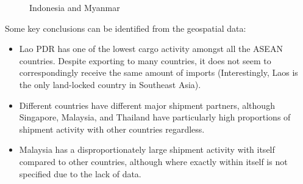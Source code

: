 \documentclass{article}
\begin{document}
\begin{figure}[H]
    \centering
    \qquad
    \caption{Indonesia and Myanmar}
    \label{fig: sg}
\end{figure}

\noindent Some key conclusions can be identified from the geospatial data: \\

\begin{itemize}
    \item Lao PDR has one of the lowest cargo activity amongst all the ASEAN countries. Despite exporting to many countries, it does not seem to correspondingly receive the same amount of imports (Interestingly, Laos is the only land-locked country in Southeast Asia). 
    \item Different countries have different major shipment partners, although Singapore, Malaysia, and Thailand have particularly high proportions of shipment activity with other countries regardless.
    \item Malaysia has a disproportionately large shipment activity with itself compared to other countries, although where exactly within itself is not specified due to the lack of data.
\end{itemize}
\end{document}
